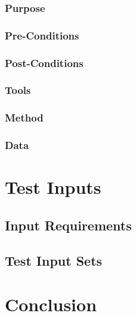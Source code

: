 \documentclass[letterpaper,10pt]{article}
\begin{document}
\subsubsection{Purpose}
\subsubsection{Pre-Conditions}
\subsubsection{Post-Conditions}
\subsubsection{Tools}
\subsubsection{Method}
\subsubsection{Data}

\section{Test Inputs}
\subsection{Input Requirements}
\subsection{Test Input Sets}

\section{Conclusion}
\end{document}
